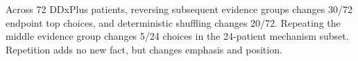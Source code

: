 Across 72 DDxPlus patients, reversing subsequent evidence groups changes 30/72 endpoint top choices, and deterministic shuffling changes 20/72. Repeating the middle evidence group changes 5/24 choices in the 24-patient mechanism subset. Repetition adds no new fact, but changes emphasis and position.
